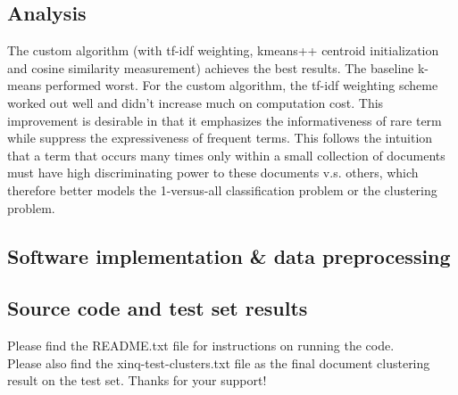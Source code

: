 \documentclass{article}
\begin{document}
\subsection{Analysis}
The custom algorithm (with tf-idf weighting, kmeans++ centroid initialization and cosine similarity measurement) achieves the best results. The baseline k-means performed worst. For the custom algorithm, the tf-idf weighting scheme worked out well and didn't increase much on computation cost. This improvement is desirable in that it emphasizes the informativeness of rare term while suppress the expressiveness of frequent terms. This follows the intuition that a term that occurs many times only within a small collection of documents must have high discriminating power to these documents v.s. others, which therefore better models the 1-versus-all classification problem or the clustering problem.
\subsection{Software implementation \& data preprocessing}
\subsection{Source code and test set results}
Please find the README.txt file for instructions on running the code. \\

Please also find the xinq-test-clusters.txt file as the final document clustering result on the test set. Thanks for your support!
\end{document}
